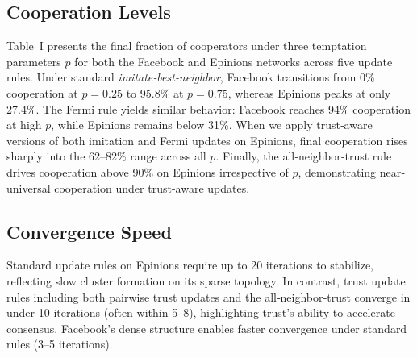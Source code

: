 \subsection{Cooperation Levels}
Table~I presents the final fraction of cooperators under three temptation parameters \(p\) for both the Facebook and Epinions networks across five update rules. Under standard \emph{imitate‐best‐neighbor}, Facebook transitions from 0\% cooperation at \(p=0.25\) to 95.8\% at \(p=0.75\), whereas Epinions peaks at only 27.4\%. The Fermi rule yields similar behavior: Facebook reaches 94\% cooperation at high \(p\), while Epinions remains below 31\%. When we apply trust‐aware versions of both imitation and Fermi updates on Epinions, final cooperation rises sharply into the 62–82\% range across all \(p\). Finally, the all‐neighbor‐trust rule drives cooperation above 90\% on Epinions irrespective of \(p\), demonstrating near‐universal cooperation under trust-aware updates.

\subsection{Convergence Speed}
Standard update rules on Epinions require up to 20 iterations to stabilize, reflecting slow cluster formation on its sparse topology. In contrast, trust update rules including both pairwise trust updates and the all‐neighbor‐trust converge in under 10 iterations (often within 5–8), highlighting trust’s ability to accelerate consensus. Facebook’s dense structure enables faster convergence under standard rules (3–5 iterations). 


